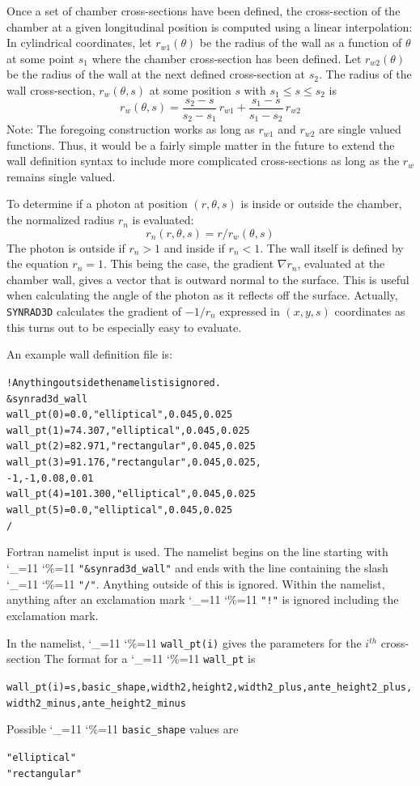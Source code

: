 \documentclass[11pt]{article}
\newcommand{\srthree}{\texttt{SYNRAD3D}\xspace}
\newcommand\ttcmd{\begingroup\catcode`\_=11 \catcode`\%=11 \dottcmd}
\newcommand\dottcmd[1]{\texttt{#1}\endgroup}
\newcommand{\Begineq}{\begin{equation}}
\newcommand{\Endeq}{\end{equation}}
\newcommand{\vn}{\ttcmd}
\newcommand{\Th}{$^{th}$\xspace}
\newlength{\ExBeg}
\newlength{\ExEnd}
\newenvironment{example}
  {\vspace{\ExBeg} \begin{alltt}}
  {\end{alltt} \vspace{\ExEnd}}
\begin{document}
Once a set of chamber cross-sections have been defined, the
cross-section of the chamber at a given longitudinal position is
computed using a linear interpolation: In cylindrical coordinates,
let $r_{w1}(\theta)$ be the radius of the wall as a function of
$\theta$ at some point $s_1$ where the chamber cross-section has been
defined. Let $r_{w2}(\theta)$ be the radius of the wall at the next
defined cross-section at $s_2$. The radius of the wall cross-section,
$r_w(\theta, s)$ at some position $s$ with $s_1 \le s \le s_2$ is
\Begineq
  r_w(\theta, s) = \frac{s_2 - s}{s_2 - s_1} \, r_{w1} + \frac{s_1 - s}{s_1 - s_2} \, r_{w2}
\Endeq
Note: The foregoing construction works as long as $r_{w1}$ and
$r_{w2}$ are single valued functions. Thus, it would be a fairly
simple matter in the future to extend the wall definition syntax to include more
complicated cross-sections as long as the $r_w$ remains single valued.

To determine if a photon at position $(r, \theta, s)$ is inside or outside the
chamber, the normalized radius $r_n$ is evaluated:
\Begineq
  r_n(r, \theta, s) = r / r_w(\theta, s)
\Endeq
The photon is outside if $r_n > 1$ and inside if $r_n < 1$. The wall
itself is defined by the equation $r_n = 1$. This being the case, the
gradient $\nabla r_n$, evaluated at the chamber wall, gives a vector
that is outward normal to the surface. This is useful when calculating
the angle of the photon as it reflects off the surface. Actually,
\srthree calculates the gradient of $-1/r_n$ expressed in $(x, y, s)$
coordinates as this turns out to be especially easy to evaluate.

An example wall definition file is:
\begin{example}
  ! Anything outside the namelist is ignored.
  &synrad3d_wall
   wall_pt(0) = 0.0, "elliptical", 0.045, 0.025
   wall_pt(1) = 74.307, "elliptical", 0.045, 0.025
   wall_pt(2) = 82.971, "rectangular", 0.045, 0.025
   wall_pt(3) = 91.176, "rectangular", 0.045, 0.025,
                            -1, -1, 0.08, 0.01
   wall_pt(4) = 101.300, "elliptical", 0.045, 0.025
   wall_pt(5) = 0.0, "elliptical", 0.045, 0.025
  /
\end{example}
Fortran namelist input is used. 
The namelist begins on the line starting with \vn{"\&synrad3d_wall"}
and ends with the line containing the slash \vn{"/"}. Anything outside
of this is ignored. Within the namelist, anything after an exclamation
mark \vn{"!"} is ignored including the exclamation mark. 

In the namelist, \vn{wall_pt(i)} gives the parameters for the $i$\Th
cross-section The format for a \vn{wall_pt} is
\begin{example}
  wall_pt(i) = s, basic_shape, width2, height2, width2_plus, ante_height2_plus, 
                  width2_minus, ante_height2_minus
\end{example}
Possible \vn{basic_shape} values are
\begin{example}
  "elliptical"
  "rectangular"
\end{example}
\end{document}
